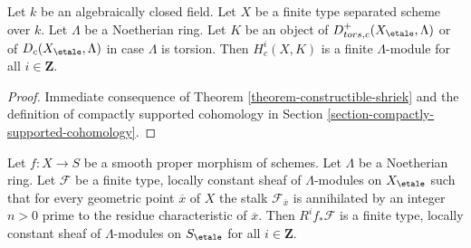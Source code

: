 \begin{lemma}
\label{lemma-finiteness-compactly-supported}
Let $k$ be an algebraically closed field.
Let $X$ be a finite type separated scheme over $k$.
Let $\Lambda$ be a Noetherian ring. Let $K$ be an object of
$D^+_{tors, c}(X_\etale, \Lambda)$ or of $D_c(X_\etale, \Lambda)$
in case $\Lambda$ is torsion. Then
$H^i_c(X, K)$ is a finite $\Lambda$-module for all
$i \in \mathbf{Z}$.
\end{lemma}

\begin{proof}
Immediate consequence of Theorem \ref{theorem-constructible-shriek}
and the definition of compactly supported cohomology in
Section \ref{section-compactly-supported-cohomology}.
\end{proof}

\begin{proposition}
\label{proposition-loc-cst-torsion}
Let $f : X \to S$ be a smooth proper morphism of schemes.
Let $\Lambda$ be a Noetherian ring. Let $\mathcal{F}$ be a
finite type, locally constant sheaf of $\Lambda$-modules
on $X_\etale$ such that for every geometric point $\overline{x}$ of $X$
the stalk $\mathcal{F}_{\overline{x}}$ is annihilated by an integer
$n > 0$ prime to the residue characteristic of $\overline{x}$.
Then $R^if_*\mathcal{F}$ is a finite type, locally constant sheaf of
$\Lambda$-modules on $S_\etale$ for all $i \in \mathbf{Z}$.
\end{proposition}

